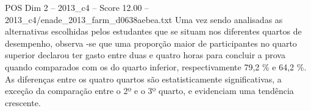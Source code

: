 \begin{textsample}{POS Dim 2 – 2013\_c4 – Score 12.00 – 2013\_c4/enade\_2013\_farm\_d0638aebea.txt}
Uma vez sendo analisadas as alternativas escolhidas pelos estudantes que se situam nos diferentes quartos de desempenho, observa -se que uma proporção maior de participantes no quarto superior declarou ter gasto entre duas e quatro horas para concluir a prova quando comparados com os do quarto inferior, respectivamente 79,2 \% e 64,2 \%.
As diferenças entre os quatro quartos são estatisticamente significativas, a exceção da comparação entre o 2º e o 3º quarto, e evidenciam uma tendência crescente.

\end{textsample}
